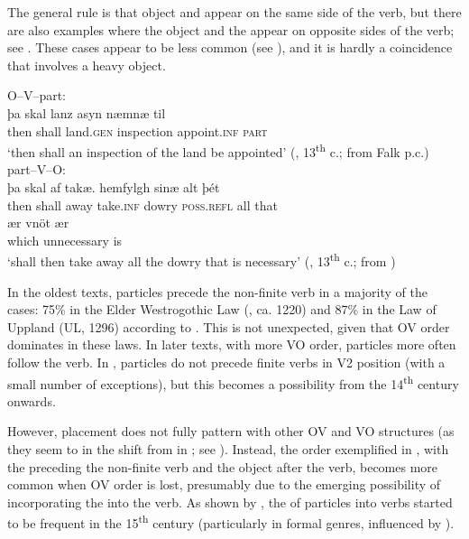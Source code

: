 \documentclass[output=paper]{langscibook}
\begin{document}
The general rule is that object and  appear on the same side of the verb, but there are also examples where the object and the  appear on opposite sides of the verb; see . These cases appear to be less common (see \citealt{Ljunggren1932}), and it is hardly a coincidence that  involves a heavy object.


\ea\label{ex:lalu:22}
\ea\label{ex:lalu:22a} O--V–part:  \\
\gll þa     skal   lanz       asyn       næmnæ       til\\
    then   shall   land.\textsc{gen}   inspection   appoint.\textsc{inf}   \textsc{part} \\
\glt `then shall an inspection of the land be appointed’ (, 13\textsuperscript{th} c.; from Falk p.c.)\\

\ex \label{ex:lalu:22b}part–V–O:     \\
\gll þa     skal   af  takæ.   hemfylgh   sinæ       alt   þét \\
    then   shall   away  take.\textsc{inf}  dowry     \textsc{poss.refl}   all   that \\

\gll ær       vnöt         ær\\
    which   unnecessary   is \\
\glt `shall then take away all the dowry that is necessary’ (, 13\textsuperscript{th} c.; from \citealt{Ljunggren1932})\\
\z
\z



In the oldest texts, particles precede the non-finite verb in a majority of the cases: 75\% in the Elder Westrogothic Law (, ca. 1220) and 87\% in the Law of Uppland (UL, 1296) according to \citet[95]{Ljunggren1932}. This is not unexpected, given that OV order dominates in these laws. In later texts, with more VO order, particles more often follow the verb. In , particles do not precede finite verbs in V2 position (with a small number of exceptions), but this becomes a possibility from the 14\textsuperscript{th} century onwards. 



However,  placement does not fully pattern with other OV and VO structures (as they seem to in the shift from  in ; see \citealt{Hroarsdottir2008}). Instead, the order exemplified in , with the  preceding the non-finite verb and the object after the verb, becomes more common when OV order is lost, presumably due to the emerging possibility of incorporating the  into the verb. As shown by \citet{Ljunggren1932,Ljunggren1937}, the  of particles into verbs started to be frequent in the 15\textsuperscript{th} century (particularly in formal genres, influenced by ).
\end{document}
